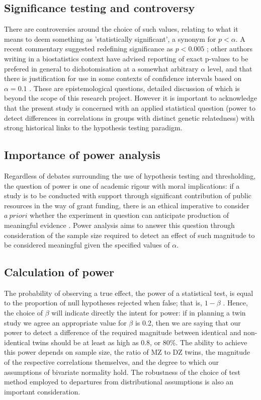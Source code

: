 \subsection{Significance testing and controversy}
There are controversies around the choice of such values, relating to what it means to deem something as 'statistically significant', a synonym for $p < \alpha$. A recent commentary suggested redefining significance as $p < 0.005$ \cite{Benjamin2018}; other authors writing in a biostatistics context have advised reporting of exact p-values to be prefered in general to dichotomisation at a somewhat arbitrary $\alpha$ level, and that there is justification for use in some contexts of confidence intervals based on $\alpha=0.1$ \cite{Clayton1993}.  These are epistemological questions, detailed discussion of which is beyond the scope of this research project.  However it is important to acknowledge that the present study is concerned with an applied statistical question (power to detect differences in correlations in groups with distinct genetic relatedness) with strong historical links to the hypothesis testing paradigm.  

\subsection{Importance of power analysis}
Regardless of debates surrounding the use of hypothesis testing and thresholding, the question of power is one of academic rigour with moral implications: if a study is to be conducted with support through significant contribution of public resources in the way of grant funding, there is an ethical imperative to consider $a \ priori$ whether the experiment in question can anticipate production of meaningful evidence \cite{Freiman1978,Cohen1988}.  Power analysis aims to answer this question through consideration of the sample size required to detect an effect of such magnitude to be considered meaningful given the specified values of $\alpha$.  

\subsection{Calculation of power}
The probability of observing a true effect, the power of a statistical test, is equal to the proportion of null hypotheses rejected when false; that is, $1 - \beta$ \cite{Cohen1988}.  Hence, the choice of $\beta$ will indicate directly the intent for power: if in planning a twin study we agree an appropriate value for $\beta$ is 0.2, then we are saying that our power to detect a difference of the required magnitude between identical and non-identical twins should be at least as high as 0.8, or 80\%. The ability to achieve this power depends on sample size, the ratio of MZ to DZ twins, the magnitude of the respective correlations themselves, and the degree to which our assumptions of bivariate normality hold. The robustness of the choice of test method employed to departures from distributional assumptions is also an important consideration.

